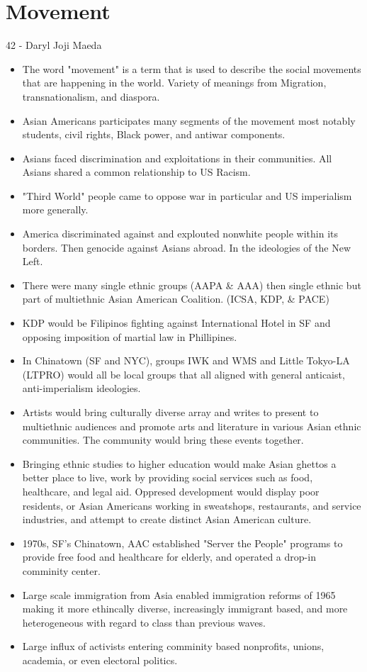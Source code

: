 \documentclass{article}
\begin{document}
\section{Movement}
42 - Daryl Joji Maeda
\begin{itemize}
  \item The word "movement" is a term that is used to describe
    the social movements that are happening in the world.
    Variety of meanings from Migration, transnationalism,
    and diaspora.
  \item Asian Americans participates many segments of the movement
    most notably students, civil rights, Black power,
    and antiwar components.
  \item Asians faced discrimination and exploitations
    in their communities. All Asians shared a common relationship
    to US Racism.
  \item "Third World" people came to oppose war in particular
    and US imperialism more generally.
  \item America discriminated against and explouted
    nonwhite people within its borders. Then genocide
    against Asians abroad. In the ideologies of the New Left.
  \item There were many single ethnic groups (AAPA \& AAA) then
    single ethnic but part of multiethnic Asian American Coalition. (ICSA, KDP, \& PACE)
  \item KDP would be Filipinos fighting against International Hotel in SF
    and opposing imposition of martial law in Phillipines.
  \item In Chinatown (SF and NYC), groups IWK and WMS and Little Tokyo-LA (LTPRO)
    would all be local groups that all aligned with general
    anticaist, anti-imperialism ideologies.
  \item Artists would bring culturally diverse array and writes to present
    to multiethnic audiences and promote arts and literature in various Asian
    ethnic communities. The community would bring these events together.
  \item Bringing ethnic studies to higher education would make Asian ghettos
    a better place to live, work by providing social services such as
    food, healthcare, and legal aid. Oppresed development would display
    poor residents, or Asian Americans working in sweatshops, restaurants,
    and service industries, and attempt to create distinct Asian American culture.
  \item 1970s, SF's Chinatown, AAC established "Server the People" programs
    to provide free food and healthcare for elderly, and operated a drop-in
    comminity center.
  \item Large scale immigration from Asia enabled immigration reforms of 1965
    making it more ethincally diverse, increasingly immigrant based,
    and more heterogeneous with regard to class than previous waves.
  \item Large influx of activists entering 
    comminity based nonprofits, unions,
    academia, or even electoral politics.
\end{itemize}
\end{document}

